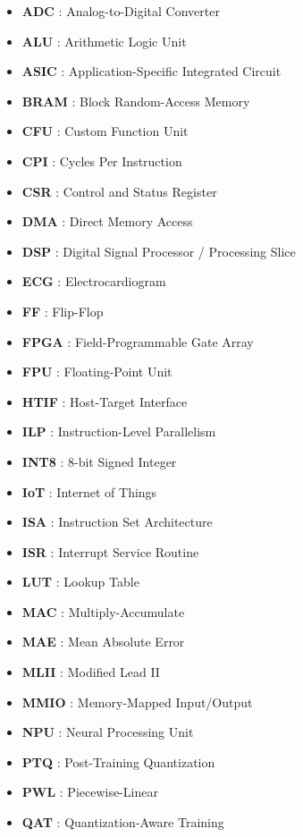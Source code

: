 \documentclass[11pt,a4paper,oneside]{report}
\begin{document}
\begin{itemize}[itemsep=0pt]
  \item[]\textbf{ADC}     : Analog-to-Digital Converter
  \item[]\textbf{ALU}     : Arithmetic Logic Unit
  \item[]\textbf{ASIC}    : Application-Specific Integrated Circuit
  \item[]\textbf{BRAM}    : Block Random-Access Memory
  \item[]\textbf{CFU}     : Custom Function Unit
  \item[]\textbf{CPI}     : Cycles Per Instruction
  \item[]\textbf{CSR}     : Control and Status Register
  \item[]\textbf{DMA}     : Direct Memory Access
  \item[]\textbf{DSP}     : Digital Signal Processor / Processing Slice
  \item[]\textbf{ECG}     : Electrocardiogram
  \item[]\textbf{FF}      : Flip-Flop
  \item[]\textbf{FPGA}    : Field-Programmable Gate Array
  \item[]\textbf{FPU}     : Floating-Point Unit
  \item[]\textbf{HTIF}    : Host-Target Interface
  \item[]\textbf{ILP}     : Instruction-Level Parallelism
  \item[]\textbf{INT8}    : 8-bit Signed Integer
  \item[]\textbf{IoT}     : Internet of Things
  \item[]\textbf{ISA}     : Instruction Set Architecture
  \item[]\textbf{ISR}     : Interrupt Service Routine
  \item[]\textbf{LUT}     : Lookup Table
  \item[]\textbf{MAC}     : Multiply-Accumulate
  \item[]\textbf{MAE}     : Mean Absolute Error
  \item[]\textbf{MLII}    : Modified Lead II
  \item[]\textbf{MMIO}    : Memory-Mapped Input/Output
  \item[]\textbf{NPU}     : Neural Processing Unit
  \item[]\textbf{PTQ}     : Post-Training Quantization
  \item[]\textbf{PWL}     : Piecewise-Linear
  \item[]\textbf{QAT}     : Quantization-Aware Training

\end{itemize}
\end{document}
